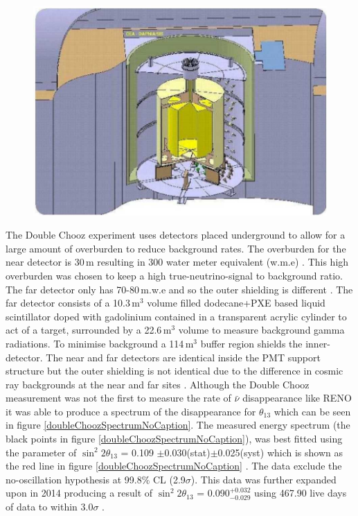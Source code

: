 \begin{figure}[!h]
 \centering
 \includegraphics[width=0.5\linewidth]{Chapter1/Figs/doublChoozDetectorDiagram.jpg} %
 \label{fig:DoubleChoozFarDetector}
\end{figure}
The Double Chooz experiment uses detectors placed underground to allow for a large amount of overburden to reduce background rates. The overburden for the near detector is 30\,m resulting in 300 water meter equivalent (w.m.e) \cite{lasserre2006}. This high overburden was chosen to keep a high true-neutrino-signal to background ratio. The far detector only has 70-80\,m.w.e and so the outer shielding is different \cite{lasserre2006}. The far detector consists of a 10.3\,m$^3$ volume filled dodecane+PXE based liquid scintillator doped with gadolinium contained in a transparent acrylic cylinder to act of a target, surrounded by a 22.6\,m$^3$ volume to measure background gamma radiations. To minimise background a 114\,m$^3$ buffer region shields the inner-detector. The near and far detectors are identical inside the PMT support structure but the outer shielding is not identical due to the difference in cosmic ray backgrounds at the near and far sites \cite{lasserre2006}. Although the Double Chooz measurement  was not the first to measure the rate of $\bar{\nu}$ disappearance \cite{reno_may_2012} like RENO it was able to produce a spectrum of the disappearance for $\theta_{13}$ which can be seen in figure \ref{doubleChoozSpectrumNoCaption}. The measured energy spectrum (the black points in figure \ref{doubleChoozSpectrumNoCaption}), was best fitted using the parameter of $\sin^2{2\theta_{13}}$ = 0.109 $\pm$0.030(stat)$\pm$0.025(syst) which is shown as the red line in figure \ref{doubleChoozSpectrumNoCaption} \cite{Abe_2012}. The data exclude the no-oscillation hypothesis at 99.8$\%$ CL (2.9$\sigma$)\cite{Abe_2012}. This data was further expanded upon in 2014 producing a result of $\sin^2{2\theta_{13}}$ = 0.090$^{+0.032}_{-0.029}$ using 467.90 live days of data to within $3.0\sigma$ \cite{abe2014improved}.
